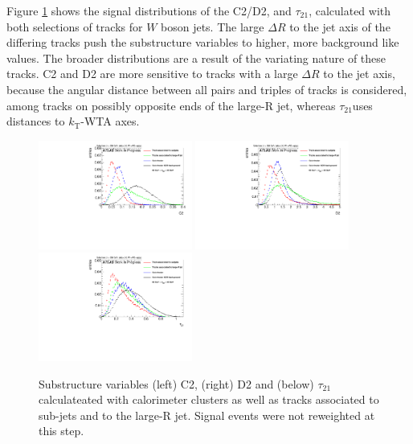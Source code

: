 Figure \ref{fig:selection} shows the signal distributions of the C2/D2, and $\tau_{21}$, calculated with both selections of tracks for $W$ boson jets. The large $\Delta R$ to the jet axis of the differing tracks push the substructure variables to higher, more background like values. The broader distributions are a result of the variating nature of these tracks. C2 and D2 are more sensitive to tracks with a large $\Delta R$ to the jet axis, because the angular distance between all pairs and triples of tracks is considered, among tracks on possibly opposite ends of the large-R jet, whereas $\tau_{21}$uses distances to $k_\mathrm{T}$-WTA axes.
\begin{figure}
	\includegraphics[width=0.45\textwidth]{sascha_input/plots/track_selection/h_ghost_sj_C2.pdf} \hspace{1mm}
	\includegraphics[width=0.45\textwidth]{sascha_input/plots/track_selection/h_ghost_sj_D2.pdf}
	\bigskip
	\centering
	\includegraphics[width=0.45\textwidth]{sascha_input/plots/track_selection/h_ghost_sj_nSub21.pdf}
\caption{\footnotesize{Substructure variables (left) C2, (right) D2 and (below) $\tau_{21}$ calculateated with calorimeter clusters as well as tracks associated to sub-jets and to the large-R jet. Signal events were not reweighted at this step.}}\label{fig:selection}
\end{figure}
